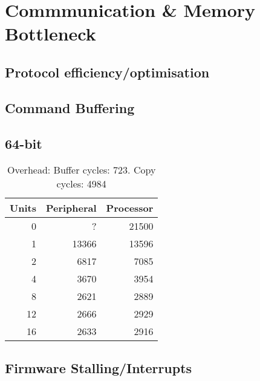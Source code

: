 \documentclass[a4paper,9pt]{report}
\begin{document}
\section{Commmunication \& Memory Bottleneck}
\subsection{Protocol efficiency/optimisation}



\subsection{Command Buffering}

\subsection{64-bit}
\begin{table}
  \centering
  \begin{tabular}{r|rr}
    \toprule
    Units & Peripheral & Processor\\
    \midrule
    0  &     ? & 21500 \\
    1  & 13366 & 13596 \\
    2  &  6817 &  7085 \\
    4  &  3670 &  3954 \\
    8  &  2621 &  2889 \\
    12 &  2666 &  2929 \\
    16 &  2633 &  2916 \\
    \bottomrule
  \end{tabular}
  \caption{Overhead: Buffer cycles: 723. Copy cycles: 4984}
\end{table}


\subsection{Firmware Stalling/Interrupts}
\end{document}
